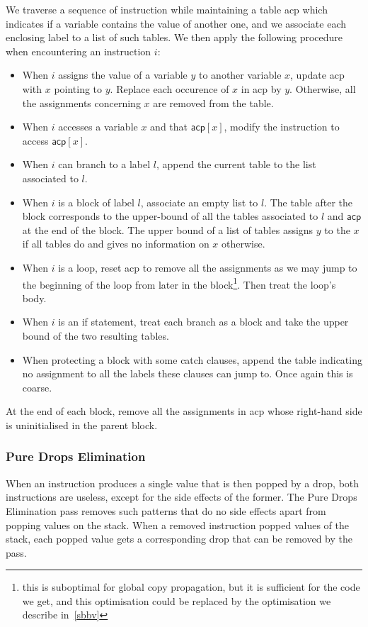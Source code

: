 \documentclass[a4paper,11pt]{article}
\begin{document}
We traverse a sequence of instruction while maintaining a table \textsf{acp}
which indicates if a variable contains the value of another one, and we
associate each enclosing label to a list of such tables. We then apply the
following procedure when encountering an instruction $i$:
\begin{itemize}\setlength{\itemsep}{0pt}
  \item When $i$ assigns the value of a variable $y$ to another
    variable $x$, update \textsf{acp} with $x$ pointing to $y$. Replace each
    occurence of $x$ in \textsf{acp} by $y$. Otherwise, all the assignments
    concerning $x$ are removed from the table.
  \item When $i$ accesses a variable $x$ and that $\textsf{acp}[x]$,
    modify the instruction to access $\textsf{acp}[x]$.
  \item When $i$ can branch to a label $l$, append the current table to
    the list associated to $l$.
  \item When $i$ is a block of label $l$, associate an empty list to $l$. The
    table after the block corresponds to the upper-bound of all the tables
    associated to $l$ and $\textsf{acp}$ at the end of the block. The upper
    bound of a list of tables assigns $y$ to the $x$ if all tables do and gives
    no information on $x$ otherwise.
  \item When $i$ is a loop, reset \textsf{acp} to remove all the
    assignments as we may jump to the beginning of the loop from later in the
    block\footnote{this is suboptimal for global copy propagation, but it is
    sufficient for the code we get, and this optimisation could be replaced by
    the optimisation we describe in~\ref{sbbv}}. Then treat the loop's body.
  \item When $i$ is an if statement, treat each branch as a block and
    take the upper bound of the two resulting tables.
  \item When protecting a block with some \textsf{catch} clauses, append
    the table indicating no assignment to all the labels these clauses can jump
    to. Once again this is coarse.
\end{itemize}

At the end of each block, remove all the assignments in \textsf{acp} whose
right-hand side is uninitialised in the parent block.
\subsubsection{Pure Drops Elimination}
When an instruction produces a single value that is then popped by a
\textsf{drop}, both instructions are useless, except for the side effects of the
former. The Pure Drops Elimination pass removes such patterns that do no side
effects apart from popping values on the stack. When a removed instruction
popped values of the stack, each popped value gets a corresponding \textsf{drop}
that can be removed by the pass.
\end{document}
